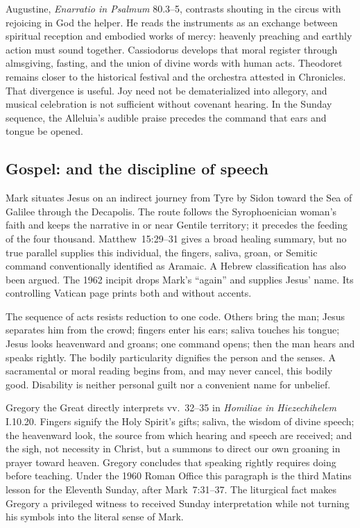 Augustine, \emph{Enarratio in Psalmum} 80.3--5, contrasts shouting in the
circus with rejoicing in God the helper. He reads the instruments as an
exchange between spiritual reception and embodied works of mercy: heavenly
preaching and earthly action must sound together. Cassiodorus develops that
moral register through almsgiving, fasting, and the union of divine words
with human acts. Theodoret remains closer to the historical festival and the
orchestra attested in Chronicles. That divergence is useful. Joy need not be
dematerialized into allegory, and musical celebration is not sufficient
without covenant hearing. In the Sunday sequence, the Alleluia's audible
praise precedes the command that ears and tongue be opened.

\subsection*{Gospel:  and the discipline of speech\enspace{}}

Mark situates Jesus on an indirect journey from Tyre by Sidon toward the Sea
of Galilee through the Decapolis. The route follows the Syrophoenician woman's
faith and keeps the narrative in or near Gentile territory; it precedes the
feeding of the four thousand. Matthew~15:29--31 gives a broad healing summary,
but no true parallel supplies this individual, the fingers, saliva, groan, or
Semitic command conventionally identified as Aramaic. A Hebrew classification
has also been argued. The 1962 incipit drops Mark's ``again'' and supplies Jesus'
name. Its controlling Vatican page prints both  and
 without accents.

The sequence of acts resists reduction to one code. Others bring the man;
Jesus separates him from the crowd; fingers enter his ears; saliva touches
his tongue; Jesus looks heavenward and groans; one command opens; then the
man hears and speaks rightly. The bodily particularity dignifies the person
and the senses. A sacramental or moral reading begins from, and may never
cancel, this bodily good. Disability is neither personal guilt nor a convenient
name for unbelief.

Gregory the Great directly interprets vv.~32--35 in \emph{Homiliae in
Hiezechihelem} I.10.20. Fingers signify the Holy Spirit's gifts; saliva, the
wisdom of divine speech; the heavenward look, the source from which hearing
and speech are received; and the sigh, not necessity in Christ, but a summons
to direct our own groaning in prayer toward heaven. Gregory concludes that speaking rightly requires doing before
teaching. Under the 1960 Roman Office this paragraph is the third Matins
lesson for the Eleventh Sunday, after Mark~7:31--37. The liturgical fact makes
Gregory a privileged witness to received Sunday interpretation while not
turning his symbols into the literal sense of Mark.

